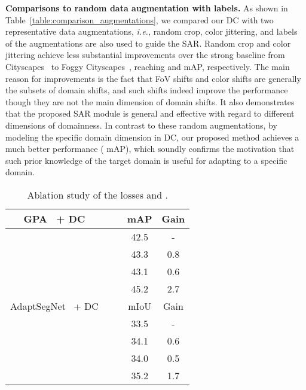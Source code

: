 \documentclass[10pt,journal,compsoc]{IEEEtran}
\begin{document}
\noindent \textbf{Comparisons to random data augmentation with labels.}  
As shown in Table~\ref{table:comparison_augmentations}, we compared our DC with two representative data augmentations, \emph{i.e.,} random crop, color jittering, and labels of the augmentations are also used to guide the SAR. Random crop and color jittering achieve less substantial improvements over the strong baseline from Cityscapes~\cite{cordts2016cityscapes} to Foggy Cityscapes~\cite{FoggyCity}, reaching  and  mAP, respectively. The main reason for improvements is the fact that FoV shifts and color shifts are generally the subsets of domain shifts, and such shifts indeed improve the performance though they are not the main dimension of domain shifts. It also demonstrates that the proposed SAR module is general and effective with regard to different dimensions of domainness. In contrast to these random augmentations, by modeling the specific domain dimension in DC, our proposed method achieves a much better performance ( mAP), which soundly confirms the motivation that such prior knowledge of the target domain is useful for adapting to a specific domain.



\begin{table}[t]
\caption{
Comparison to data augmentations with labels. 
}
\centering
{}
\end{table}

\begin{table}[t]
\caption{ Ablation study of the losses  and .
}
\label{table:ablation_each_loss}
\begin{center}
\vspace{-3mm}
\begin{tabular}{ccc|c|c} \toprule
GPA~\cite{GPA} + DC &  &   & mAP & Gain\\
\midrule
  &  &  & 42.5 & -\\
  &   &  & 43.3 & 0.8\\
  &   &   & 43.1 & 0.6\\
  &   &   & 45.2 & 2.7\\
\midrule
AdaptSegNet~\cite{AdaptSegNet} + DC &   &    & mIoU & Gain\\
\midrule
  &  &  & 33.5 & -\\
  &   &  & 34.1 & 0.6\\
  &  &   & 34.0 & 0.5\\
  &  &   & 35.2 & 1.7\\
\bottomrule
\end{tabular}
\end{center}
\end{table}
\end{document}
